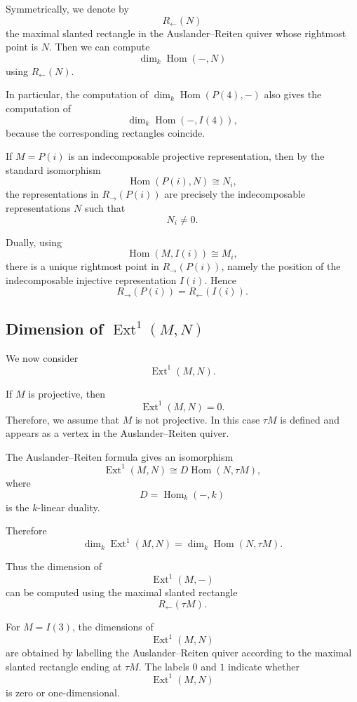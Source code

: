\documentclass[11pt, a4paper]{report}
\begin{document}
Symmetrically, we denote by
\[
    R_{\leftarrow}(N)
\]
the maximal slanted rectangle in the Auslander--Reiten quiver whose rightmost
point is \(N\). Then we can compute
\[
    \dim_k \operatorname{Hom}(-,N)
\]
using \(R_{\leftarrow}(N)\).

In particular, the computation of \(\dim_k\operatorname{Hom}(P(4),-)\) also gives
the computation of
\[
    \dim_k\operatorname{Hom}(-,I(4)),
\]
because the corresponding rectangles coincide.

\begin{remark}
    If \(M=P(i)\) is an indecomposable projective representation, then by the
    standard isomorphism
    \[
        \operatorname{Hom}(P(i),N)\cong N_i,
    \]
    the representations in \(R_{\rightarrow}(P(i))\) are precisely the
    indecomposable representations \(N\) such that
    \[
        N_i\neq 0.
    \]

    Dually, using
    \[
        \operatorname{Hom}(M,I(i))\cong M_i,
    \]
    there is a unique rightmost point in \(R_{\rightarrow}(P(i))\), namely the
    position of the indecomposable injective representation \(I(i)\). Hence
    \[
        R_{\rightarrow}(P(i))
        =
        R_{\leftarrow}(I(i)).
    \]
\end{remark}

\subsection{Dimension of \texorpdfstring{\(\operatorname{Ext}^1(M,N)\)}{Ext1(M,N)}}

We now consider
\[
    \operatorname{Ext}^1(M,N).
\]

If \(M\) is projective, then
\[
    \operatorname{Ext}^1(M,N)=0.
\]
Therefore, we assume that \(M\) is not projective. In this case \(\tau M\) is
defined and appears as a vertex in the Auslander--Reiten quiver.

The Auslander--Reiten formula gives an isomorphism
\[
    \operatorname{Ext}^1(M,N)
    \cong
    D\operatorname{Hom}(N,\tau M),
\]
where
\[
    D=\operatorname{Hom}_k(-,k)
\]
is the \(k\)-linear duality.

Therefore
\[
    \dim_k \operatorname{Ext}^1(M,N)
    =
    \dim_k \operatorname{Hom}(N,\tau M).
\]

Thus the dimension of
\[
    \operatorname{Ext}^1(M,-)
\]
can be computed using the maximal slanted rectangle
\[
    R_{\leftarrow}(\tau M).
\]

\begin{example}
    For \(M=I(3)\), the dimensions of
    \[
        \operatorname{Ext}^1(M,N)
    \]
    are obtained by labelling the Auslander--Reiten quiver according to the
    maximal slanted rectangle ending at \(\tau M\). The labels \(0\) and \(1\)
    indicate whether
    \[
        \operatorname{Ext}^1(M,N)
    \]
    is zero or one-dimensional.
\end{example}
\end{document}
